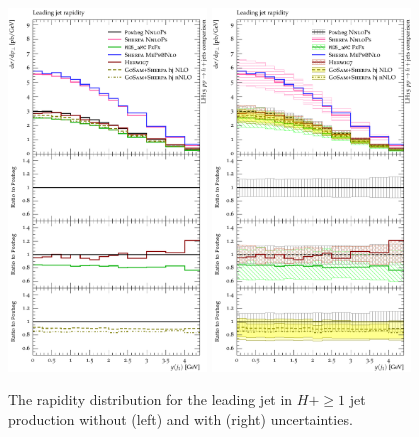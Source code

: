 \begin{figure}[t!]
  \centering
  \includegraphics[width=0.47\textwidth]{figures/hjetscomp_u_jet1_y.pdf}
  \hfill
  \includegraphics[width=0.47\textwidth]{figures/hjetscomp_jet1_y.pdf}
  \caption{
    The rapidity distribution for the leading jet in $H+\ge1$ jet production
    without (left) and with (right) uncertainties. 
    \label{fig:higgscomp:results:1obs:j1y}
  }
\end{figure}

